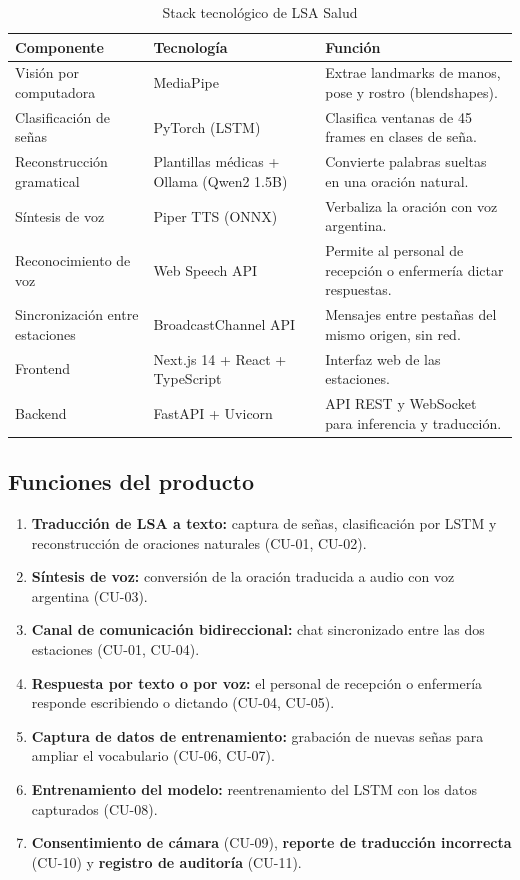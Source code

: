 \begin{table}[H]
    \centering
    \caption{Stack tecnológico de LSA Salud}
    \label{tab:stack}
    \small
    \begin{tabularx}{\textwidth}{>{\raggedright\arraybackslash}p{4cm} >{\raggedright\arraybackslash}p{4.4cm} X}
        \toprule
        \textbf{Componente} & \textbf{Tecnología} & \textbf{Función} \\
        \midrule
        Visión por computadora & MediaPipe & Extrae landmarks de manos, pose y rostro (blendshapes). \\
        Clasificación de señas & PyTorch (LSTM) & Clasifica ventanas de 45 frames en clases de seña. \\
        Reconstrucción gramatical & Plantillas médicas + Ollama (Qwen2 1.5B) & Convierte palabras sueltas en una oración natural. \\
        Síntesis de voz & Piper TTS (ONNX) & Verbaliza la oración con voz argentina. \\
        Reconocimiento de voz & Web Speech API & Permite al personal de recepción o enfermería dictar respuestas. \\
        Sincronización entre estaciones & BroadcastChannel API & Mensajes entre pestañas del mismo origen, sin red. \\
        Frontend & Next.js 14 + React + TypeScript & Interfaz web de las estaciones. \\
        Backend & FastAPI + Uvicorn & API REST y WebSocket para inferencia y traducción. \\
        \bottomrule
    \end{tabularx}
\end{table}

\subsection{Funciones del producto}

\begin{enumerate}
    \item \textbf{Traducción de LSA a texto:} captura de señas, clasificación por LSTM y reconstrucción de oraciones naturales (CU-01, CU-02).
    \item \textbf{Síntesis de voz:} conversión de la oración traducida a audio con voz argentina (CU-03).
    \item \textbf{Canal de comunicación bidireccional:} chat sincronizado entre las dos estaciones (CU-01, CU-04).
    \item \textbf{Respuesta por texto o por voz:} el personal de recepción o enfermería responde escribiendo o dictando (CU-04, CU-05).
    \item \textbf{Captura de datos de entrenamiento:} grabación de nuevas señas para ampliar el vocabulario (CU-06, CU-07).
    \item \textbf{Entrenamiento del modelo:} reentrenamiento del LSTM con los datos capturados (CU-08).
    \item \textbf{Consentimiento de cámara} (CU-09), \textbf{reporte de traducción incorrecta} (CU-10) y \textbf{registro de auditoría} (CU-11).
\end{enumerate}

